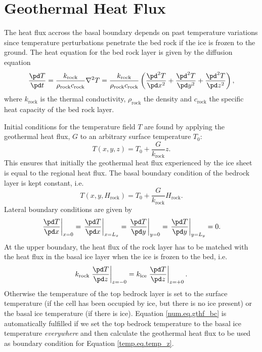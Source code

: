 \section{Geothermal Heat Flux}
The heat flux accross the basal boundary depends on past temperature variations since temperature perturbations penetrate the bed rock if the ice is frozen to the ground. The heat equation for the bed rock layer is given by the diffusion equation
\begin{equation}
  \label{num.eq.diffu_rock}
  \frac{\pd T}{\pd t} = \frac{k_{\text{rock}}}{\rho_{\text{rock}}c_{\text{rock}}}\nabla^2T=\frac{k_{\text{rock}}}{\rho_{\text{rock}}c_{\text{rock}}} 
  \left(\frac{\pd^2 T}{\pd x^2}+\frac{\pd^2 T}{\pd y^2}+\frac{\pd^2 T}{\pd z^2}\right),
\end{equation}
where $k_{\text{rock}}$ is the thermal conductivity, $\rho_{\text{rock}}$ the density and $c_{\text{rock}}$ the specific heat capacity of the bed rock layer. 

Initial conditions for the temperature field $T$ are found by applying the geothermal heat flux, $G$ to an arbitrary surface temperature $T_0$:
\begin{equation}
  T(x,y,z)=T_0+\frac{G}{k_{\text{rock}}}z.
\end{equation}
This ensures that initially the geothermal heat flux experienced by the ice sheet is equal to the regional heat flux. The basal boundary condition of the bedrock layer is kept constant, i.e.
\begin{equation}
  T(x,y,H_{\text{rock}})=T_0+\frac{G}{k_{\text{rock}}}H_{\text{rock}}.
\end{equation}
Lateral boundary conditions are given by
\begin{equation}
  \left.\frac{\pd T}{\pd x}\right|_{x=0} = \left.\frac{\pd T}{\pd x}\right|_{x=L_x} = \left.\frac{\pd T}{\pd y}\right|_{y=0} = \left.\frac{\pd T}{\pd y}\right|_{y=L_y} = 0.
\end{equation}
At the upper boundary, the heat flux of the rock layer has to be matched with the heat flux in the basal ice layer when the ice is frozen to the bed, i.e.
\begin{equation}
  \label{num.eq.gthf_bc}
  k_{\text{rock}}\left.\frac{\pd T}{\pd z}\right|_{z=-0}=k_{\text{ice}}\left.\frac{\pd T}{\pd z}\right|_{z=+0}.
\end{equation}
Otherwise the temperature of the top bedrock layer is set to the surface temperature (if the cell has been occupied by ice, but there is no ice present) or the basal ice temperature (if there is ice). Equation \eqref{num.eq.gthf_bc} is automatically fulfilled if we set the top bedrock temperature to the basal ice temperature \emph{everywhere} and then calculate the geothermal heat flux to be used as boundary condition for Equation \eqref{temp.eq.temp_z}.



